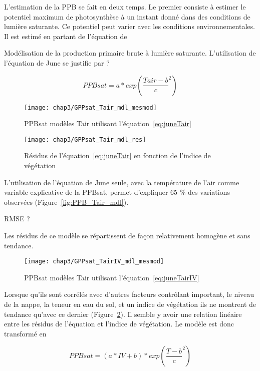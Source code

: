 
L'estimation de la PPB se fait en deux temps.
Le premier consiste à estimer le potentiel maximum de photosynthèse à un instant donné dans des conditions de lumière saturante.
Ce potentiel peut varier avec les conditions environnementales.
Il est estimé en partant de l'équation de \cite{june2004}

Modélisation de la production primaire brute à lumière saturante.
L'utilisation de l'équation de June se justifie par ?

\begin{equation}\label{eq:juneTair}
PPBsat = a * exp(\frac{Tair - b}{c}^2)
\end{equation}

\begin{figure}
\centering
\texttt{[image: chap3/GPPsat\_Tair\_mdl\_mesmod]}
\caption{PPBsat modèles Tair utilisant l'équation~\ref{eq:juneTair}}
\label{fig:PPBsat_Tair_mdl}
\end{figure}

\begin{figure}
\centering
\texttt{[image: chap3/GPPsat\_Tair\_mdl\_res]}
\caption{Résidus de l'équation~\ref{eq:juneTair} en fonction de l'indice de végétation}
\label{fig:PPBsat_Tair_res}
\end{figure}

L'utilisation de l'équation de June seule, avec la température de l'air comme variable explicative de la PPBsat, permet d'expliquer 65 \% des variations observées (Figure~\ref{fig:PPB_Tair_mdl}).

RMSE ?

Les résidus de ce modèle se répartissent de façon relativement homogène et sans tendance.


\begin{figure}
\centering
\texttt{[image: chap3/GPPsat\_TairIV\_mdl\_mesmod]}
\caption{PPBsat modèles Tair utilisant l'équation~\ref{eq:juneTairIV}}
\label{fig:PPBsat_TaIV_mdl}
\end{figure}

Lorsque qu'ils sont corrélés avec d'autres facteurs contrôlant important, le niveau de la nappe, la teneur en eau du sol, et un indice de végétation ils ne montrent de tendance qu'avec ce dernier (Figure~\ref{fig:PPBsat_Tair_res}).
Il semble y avoir une relation linéaire entre les résidus de l'équation et l'indice de végétation.
Le modèle est donc transformé en 

\begin{equation}\label{eq:juneTairIV}
PPBsat = (a * IV + b) * exp(\frac{T - b}{c}^2)
\end{equation}

